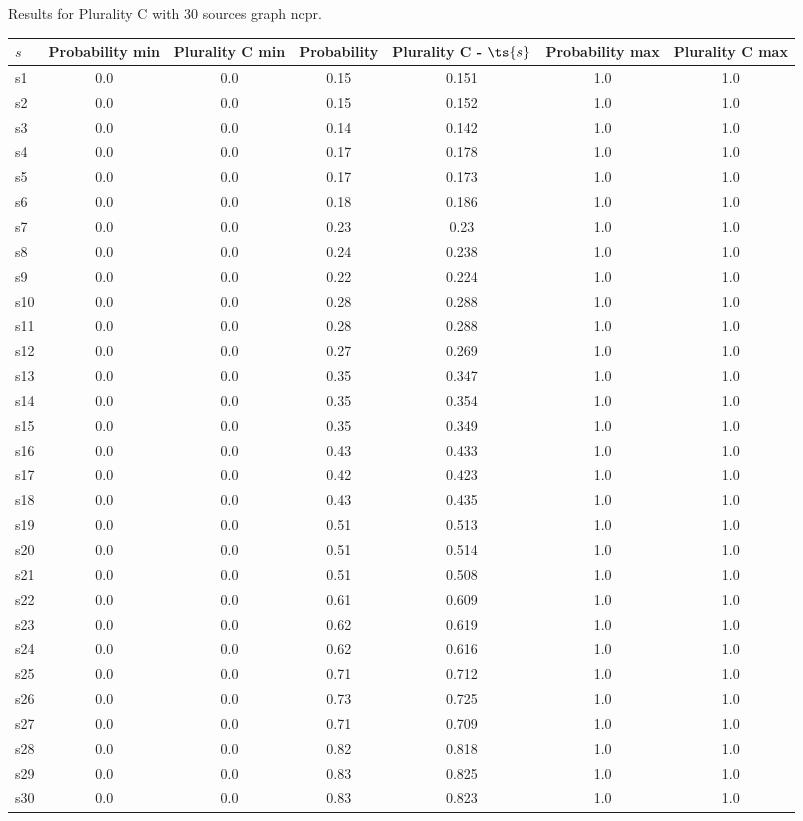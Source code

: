 \documentclass{article}
\begin{document}
\noindent Results for Plurality C with 30 sources graph ncpr.

\noindent\begin{tabular}{|l|c|c|c|c|c|c|}
\hline
$s$& Probability min & Plurality C min & Probability & Plurality C - $\ts{s}$ & Probability max & Plurality C max\\
\hline
s1 &0.0 & 0.0 & 0.15 & 0.151 & 1.0 & 1.0\\
\hline
s2 &0.0 & 0.0 & 0.15 & 0.152 & 1.0 & 1.0\\
\hline
s3 &0.0 & 0.0 & 0.14 & 0.142 & 1.0 & 1.0\\
\hline
s4 &0.0 & 0.0 & 0.17 & 0.178 & 1.0 & 1.0\\
\hline
s5 &0.0 & 0.0 & 0.17 & 0.173 & 1.0 & 1.0\\
\hline
s6 &0.0 & 0.0 & 0.18 & 0.186 & 1.0 & 1.0\\
\hline
s7 &0.0 & 0.0 & 0.23 & 0.23 & 1.0 & 1.0\\
\hline
s8 &0.0 & 0.0 & 0.24 & 0.238 & 1.0 & 1.0\\
\hline
s9 &0.0 & 0.0 & 0.22 & 0.224 & 1.0 & 1.0\\
\hline
s10 &0.0 & 0.0 & 0.28 & 0.288 & 1.0 & 1.0\\
\hline
s11 &0.0 & 0.0 & 0.28 & 0.288 & 1.0 & 1.0\\
\hline
s12 &0.0 & 0.0 & 0.27 & 0.269 & 1.0 & 1.0\\
\hline
s13 &0.0 & 0.0 & 0.35 & 0.347 & 1.0 & 1.0\\
\hline
s14 &0.0 & 0.0 & 0.35 & 0.354 & 1.0 & 1.0\\
\hline
s15 &0.0 & 0.0 & 0.35 & 0.349 & 1.0 & 1.0\\
\hline
s16 &0.0 & 0.0 & 0.43 & 0.433 & 1.0 & 1.0\\
\hline
s17 &0.0 & 0.0 & 0.42 & 0.423 & 1.0 & 1.0\\
\hline
s18 &0.0 & 0.0 & 0.43 & 0.435 & 1.0 & 1.0\\
\hline
s19 &0.0 & 0.0 & 0.51 & 0.513 & 1.0 & 1.0\\
\hline
s20 &0.0 & 0.0 & 0.51 & 0.514 & 1.0 & 1.0\\
\hline
s21 &0.0 & 0.0 & 0.51 & 0.508 & 1.0 & 1.0\\
\hline
s22 &0.0 & 0.0 & 0.61 & 0.609 & 1.0 & 1.0\\
\hline
s23 &0.0 & 0.0 & 0.62 & 0.619 & 1.0 & 1.0\\
\hline
s24 &0.0 & 0.0 & 0.62 & 0.616 & 1.0 & 1.0\\
\hline
s25 &0.0 & 0.0 & 0.71 & 0.712 & 1.0 & 1.0\\
\hline
s26 &0.0 & 0.0 & 0.73 & 0.725 & 1.0 & 1.0\\
\hline
s27 &0.0 & 0.0 & 0.71 & 0.709 & 1.0 & 1.0\\
\hline
s28 &0.0 & 0.0 & 0.82 & 0.818 & 1.0 & 1.0\\
\hline
s29 &0.0 & 0.0 & 0.83 & 0.825 & 1.0 & 1.0\\
\hline
s30 &0.0 & 0.0 & 0.83 & 0.823 & 1.0 & 1.0\\
\hline
\end{tabular}\\
\end{document}
